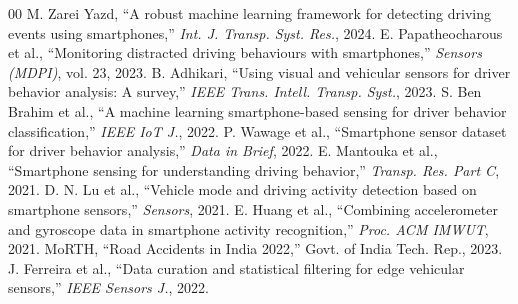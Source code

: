 \documentclass[conference]{IEEEtran}
\begin{document}
\begin{thebibliography}{00}
 M. Zarei Yazd, ``A robust machine learning framework for detecting driving events using smartphones,'' \textit{Int. J. Transp. Syst. Res.}, 2024.
 E. Papatheocharous et al., ``Monitoring distracted driving behaviours with smartphones,'' \textit{Sensors (MDPI)}, vol. 23, 2023.
 B. Adhikari, ``Using visual and vehicular sensors for driver behavior analysis: A survey,'' \textit{IEEE Trans. Intell. Transp. Syst.}, 2023.
 S. Ben Brahim et al., ``A machine learning smartphone-based sensing for driver behavior classification,'' \textit{IEEE IoT J.}, 2022.
 P. Wawage et al., ``Smartphone sensor dataset for driver behavior analysis,'' \textit{Data in Brief}, 2022.
 E. Mantouka et al., ``Smartphone sensing for understanding driving behavior,'' \textit{Transp. Res. Part C}, 2021.
 D. N. Lu et al., ``Vehicle mode and driving activity detection based on smartphone sensors,'' \textit{Sensors}, 2021.
 E. Huang et al., ``Combining accelerometer and gyroscope data in smartphone activity recognition,'' \textit{Proc. ACM IMWUT}, 2021.
 MoRTH, ``Road Accidents in India 2022,'' Govt. of India Tech. Rep., 2023.
 J. Ferreira et al., ``Data curation and statistical filtering for edge vehicular sensors,'' \textit{IEEE Sensors J.}, 2022.
\end{thebibliography}
\end{document}
